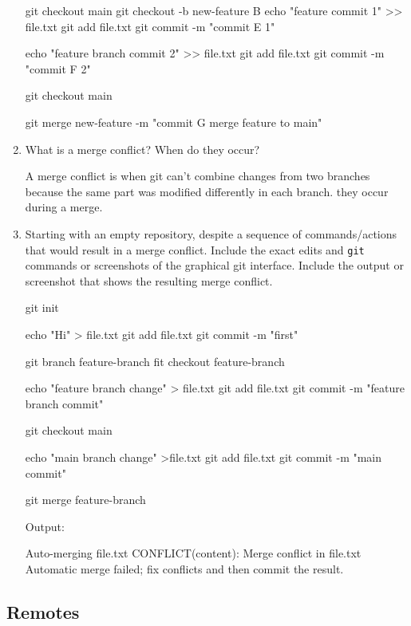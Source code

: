 \documentclass[10pt,twocolumn]{article}
\begin{document}
\begin{enumerate}
git checkout main
git checkout -b new-feature B
echo "feature commit 1" >> file.txt
git add file.txt
git commit -m "commit E 1"

echo "feature branch commit 2" >> file.txt
git add file.txt
git commit -m "commit F 2"

git checkout main

git merge new-feature -m "commit G merge feature to main"


\item What is a merge conflict? When do they occur?

A merge conflict is when git can't combine changes from two branches because the same part was modified differently in each branch. they occur during a merge.

\item Starting with an empty repository, despite a sequence of commands/actions that would result in a merge conflict. Include the exact edits and \texttt{git} commands or screenshots of the graphical git interface. Include the output or screenshot that shows the resulting merge conflict.

git init

echo "Hi" > file.txt
git add file.txt
git commit -m "first"

git branch feature-branch
fit checkout feature-branch

echo "feature branch change" > file.txt
git add file.txt
git commit -m "feature branch commit"

git checkout main

echo "main branch change" >file.txt
git add file.txt
git commit -m "main commit"

git merge feature-branch



Output:

Auto-merging file.txt
CONFLICT(content): Merge conflict in file.txt
Automatic merge failed; fix conflicts and then commit the result.


\end{enumerate}

\subsection{Remotes}
\end{document}
